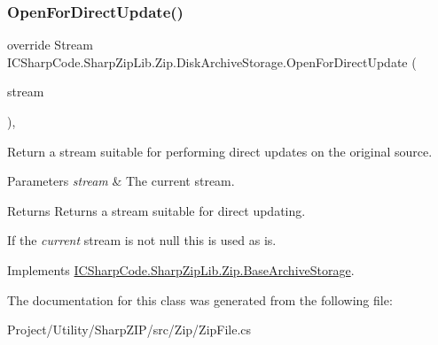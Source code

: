 \mbox{\label{class_i_c_sharp_code_1_1_sharp_zip_lib_1_1_zip_1_1_disk_archive_storage_afa463d93f03caa3af6e4ea89a1314a99}} 
\subsubsection{\texorpdfstring{Open\+For\+Direct\+Update()}{OpenForDirectUpdate()}}
{\footnotesize\ttfamily override Stream I\+C\+Sharp\+Code.\+Sharp\+Zip\+Lib.\+Zip.\+Disk\+Archive\+Storage.\+Open\+For\+Direct\+Update (\begin{DoxyParamCaption}\item[{Stream}]{stream }\end{DoxyParamCaption})\hspace{0.3cm}{\ttfamily [inline]}, {\ttfamily [virtual]}}



Return a stream suitable for performing direct updates on the original source. 


\begin{DoxyParams}{Parameters}
{\em stream} & The current stream.\\
\hline
\end{DoxyParams}
\begin{DoxyReturn}{Returns}
Returns a stream suitable for direct updating.
\end{DoxyReturn}


If the {\itshape current}  stream is not null this is used as is.

Implements \hyperlink{class_i_c_sharp_code_1_1_sharp_zip_lib_1_1_zip_1_1_base_archive_storage_a2e718c69eceae215d38d997e7b0d3693}{I\+C\+Sharp\+Code.\+Sharp\+Zip\+Lib.\+Zip.\+Base\+Archive\+Storage}.



The documentation for this class was generated from the following file\+:\begin{DoxyCompactItemize}
\item 
Project/\+Utility/\+Sharp\+Z\+I\+P/src/\+Zip/Zip\+File.\+cs\end{DoxyCompactItemize}
